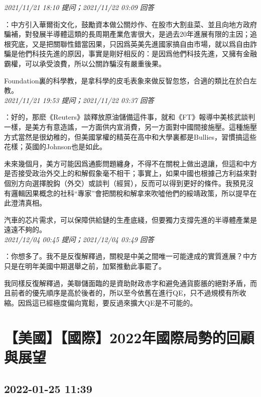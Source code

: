 \documentclass[twocolumn]{ctexart}
\begin{document}
\textit{\hfill\noindent\small 2021/11/21 18:10 提问；2021/11/22 03:09 回答}

：中方引入華爾街文化，鼓勵資本做公關炒作、在股市大割韭菜、並且向地方政府騙補，對發展半導體這類的長周期產業危害很大，是過去20年進展有限的主因；追根究底，又是把關聯性錯當因果，只因爲英美先進國家搞自由市場，就以爲自由詐騙是他們科技先進的原因，事實是剛好相反的：是因爲他們科技先進，又擁有金融霸權，可以承受浪費，所以公關詐騙沒有嚴重後果。

Foundation裏的科學教，是拿科學的皮毛表象來做反智忽悠，合適的類比在於白左教。
\\

\textit{\hfill\noindent\small 2021/11/21 19:53 提问；2021/11/22 03:37 回答}

：好的，那麽《Reuters》談釋放原油儲備這件事，就和《FT》報導中美核武談判一樣，是美方有意造謠，一方面供内宣消費，另一方面對中國間接施壓。這種施壓方式當然是很幼稚的，但美國掌權的精英在高中和大學裏都是Bullies，習慣搞這些花樣；英國的Johnson也是如此。

未來幾個月，美方可能因爲通膨問題纏身，不得不在關稅上做出退讓，但這和中方是否接受政治外交上的和解假象毫不相干；事實上，如果中國也根據己方利益來對個別方向選擇脫鈎（外交）或談判（經貿），反而可以得到更好的條件。我預見沒有邏輯因果概念的社科“專家”會把關稅和解拿來吹噓他們的綏靖政策，所以提早在此澄清真相。

汽車的芯片需求，可以保障供給鏈的生產底綫，但要獨力支撐先進的半導體產業是遠遠不夠的。
\\

\textit{\hfill\noindent\small 2021/12/04 00:45 提问；2021/12/04 03:49 回答}

：你想多了。我不是反復解釋過，關稅是中美之間唯一可能達成的實質進展？中方只是在明年美國中期選舉之前，加緊推動此事罷了。

我同樣反復解釋過，美聯儲面臨的是資助財政赤字和避免通貨膨脹的絕對矛盾，而且前者的優先順序是高於後者的，所以至今依舊在進行QE，只不過規模有所收縮。因爲這已經極度偏向寬鬆，要反過來擴大QE是不可能的。
\\


\section{【美國】【國際】2022年國際局勢的回顧與展望}
\subsection{2022-01-25 11:39}
\end{document}
